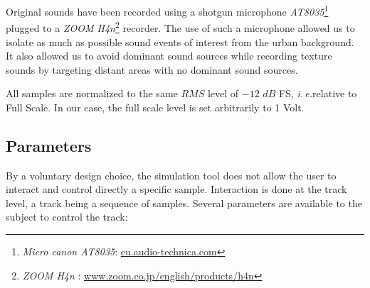 \documentclass[12pt]{elsarticle}
\newcommand{\ie}{\emph{i.\,e.}}
\begin{document}

Original sounds have been recorded using a shotgun microphone \emph{AT8035}\footnote{\emph{Micro canon AT8035}: \url{eu.audio-technica.com}} plugged to a \emph{ZOOM H4n}\footnote{\emph{ZOOM H4n} : \url{www.zoom.co.jp/english/products/h4n}} recorder. The use of such a microphone allowed us to isolate as much as possible sound events of interest from the urban background. It also allowed us to avoid dominant sound sources while recording texture sounds by targeting distant areas with no dominant sound sources.


All samples are normalized to the same $RMS$ level of $-12$ $dB$ FS, \ie relative to Full Scale. In our case, the full scale level is set arbitrarily to 1 Volt.

\subsection{Parameters}
\label{sec:simscene_parametre}


By a voluntary design choice, the simulation tool does not allow the user to interact and control directly a specific sample. Interaction is done at the track level, a track being a sequence of samples. Several parameters are available to the subject to control the track:

\end{document}
